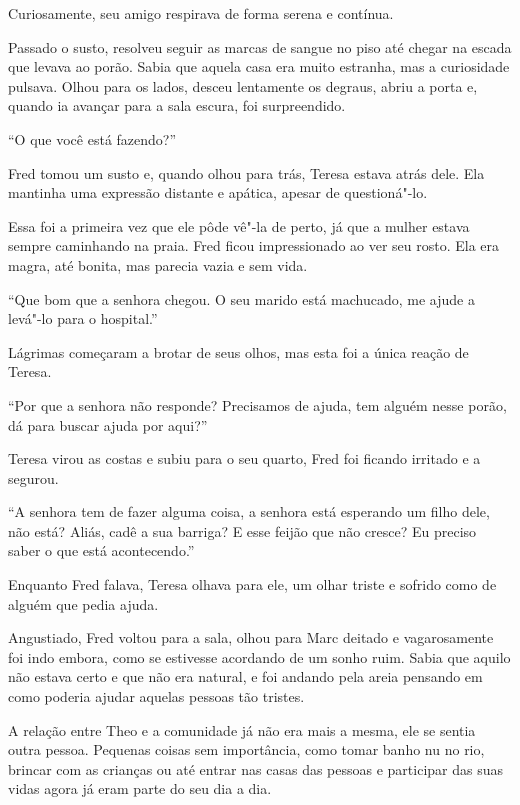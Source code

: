 Curiosamente, seu amigo respirava de forma serena e contínua.

Passado o susto, resolveu seguir as marcas de sangue no piso até
chegar na escada que levava ao porão. Sabia que aquela casa era
muito estranha, mas a curiosidade pulsava. Olhou para os lados, desceu
lentamente os degraus, abriu a porta e, quando ia avançar para a
sala escura, foi surpreendido.

``O que você está fazendo?''

Fred tomou um susto e, quando olhou para trás, Teresa estava atrás dele.
Ela mantinha uma expressão distante e apática, apesar de questioná"-lo.

Essa foi a primeira vez que ele pôde vê"-la de perto, já que a mulher
estava sempre caminhando na praia. Fred ficou impressionado ao ver
seu rosto. Ela era magra, até bonita, mas parecia vazia e sem vida.

``Que bom que a senhora chegou. O seu marido está machucado, me ajude a
levá"-lo para o hospital.''

Lágrimas começaram a brotar de seus olhos, mas esta foi a única reação
de Teresa.

``Por que a senhora não responde? Precisamos de ajuda, tem alguém nesse
porão, dá para buscar ajuda por aqui?''

Teresa virou as costas e subiu para o seu quarto, Fred foi ficando
irritado e a segurou.

``A senhora tem de fazer alguma coisa, a senhora está esperando um filho
dele, não está? Aliás, cadê a sua barriga? E esse feijão que não cresce?
Eu preciso saber o que está acontecendo.''

Enquanto Fred falava, Teresa olhava para ele, um olhar triste e sofrido
como de alguém que pedia ajuda.

Angustiado, Fred voltou para a sala, olhou para Marc deitado e
vagarosamente foi indo embora, como se estivesse acordando de um sonho
ruim. Sabia que aquilo não estava certo e que não era natural, e foi
andando pela areia pensando em como poderia ajudar aquelas pessoas tão
tristes.

\asterisc


A relação entre Theo e a comunidade já não era mais a mesma, ele se
sentia outra pessoa. Pequenas coisas sem importância, como tomar banho
nu no rio, brincar com as crianças ou até entrar nas casas das pessoas e
participar das suas vidas agora já eram parte do seu dia a dia.

